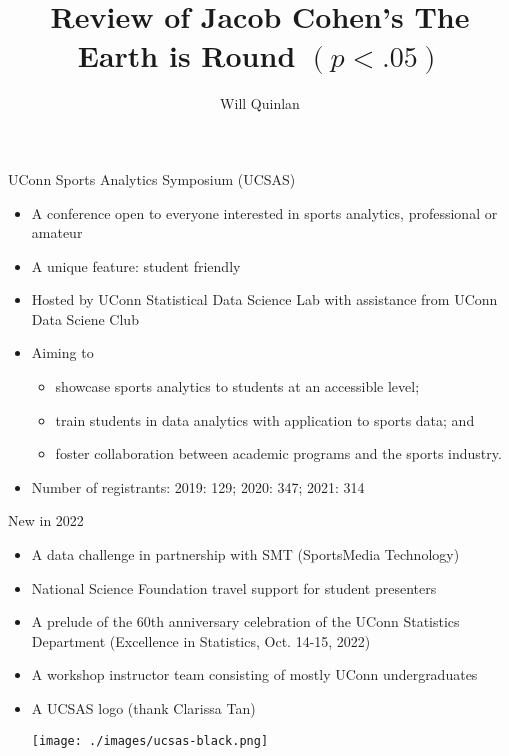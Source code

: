 \documentclass[aspectratio=169, 12pt]{beamer}
\title{Review of Jacob Cohen's The Earth is Round $(p < .05)$}
\author{Will Quinlan}
\begin{document}
 
\frame{\titlepage}

 
\begin{frame}{UConn Sports Analytics Symposium (UCSAS)}
  \begin{itemize}
  \item A conference open to everyone interested in sports analytics, professional or
    amateur
  \item A unique feature: student friendly
  \item Hosted by UConn Statistical Data Science Lab with assistance from UConn
    Data Sciene Club
  \item Aiming to
    \begin{itemize}
    \item showcase sports analytics to students at an accessible
      level;
    \item train students in data analytics with application to
      sports data; and
    \item foster collaboration between academic programs and the
      sports industry.
    \end{itemize}
  \item Number of registrants: 2019: 129; 2020: 347; 2021: 314
  \end{itemize}
\end{frame}


\begin{frame}{New in 2022}
  \begin{itemize}
  \item A data challenge in partnership with SMT (SportsMedia Technology)
  \item National Science Foundation travel support for student presenters
  \item A prelude of the 60th anniversary celebration of the UConn Statistics
    Department (Excellence in Statistics, Oct. 14-15, 2022)
  \item A workshop instructor team consisting of mostly UConn undergraduates
  \item A UCSAS logo (thank Clarissa Tan)
    
    \texttt{[image: ./images/ucsas-black.png]}
  \end{itemize}
\end{frame}
\end{document}
